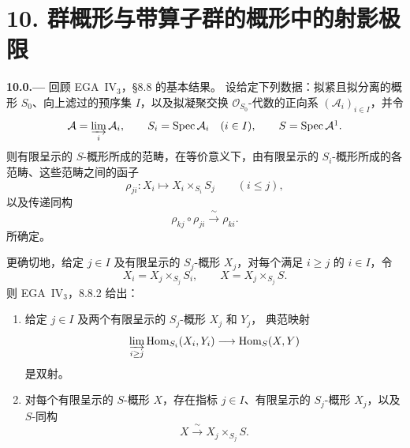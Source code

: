 
\section*{10. 群概形与带算子群的概形中的射影极限}
\label{sec:sga3-VIB-10}%

\medskip
{}\label{par:sga3-VIB-10.0}%
\noindent\textbf{10.0.---}
回顾 EGA~IV\(_3\)，\S 8.8 的基本结果。
设给定下列数据：拟紧且拟分离的概形 \(S_0\)、向上滤过的预序集
\(I\)，以及拟凝聚交换 \(\mathcal O_{S_0}\)-代数的正向系
\((\mathcal A_i)_{i\in I}\)，并令
\[
  \mathcal A=\varinjlim_i\mathcal A_i,\qquad
  S_i=\operatorname{Spec}\mathcal A_i\quad(i\in I),
  \qquad
  S=\operatorname{Spec}\mathcal A\footnotemark.
\]
则有限呈示的 \(S\)-概形所成的范畴，在等价意义下，由有限呈示的
\(S_i\)-概形所成的各范畴、这些范畴之间的函子
\[
  \rho_{ji}:X_i\longmapsto X_i\times_{S_i}S_j
  \qquad(i\leq j),
\]
以及传递同构
\[
  \rho_{kj}\circ\rho_{ji}\xrightarrow{\ \sim\ }\rho_{ki}.
\]
所确定。

更确切地，给定 \(j\in I\) 及有限呈示的 \(S_j\)-概形
\(X_j\)，对每个满足 \(i\geq j\) 的 \(i\in I\)，令
\[
  X_i=X_j\times_{S_j}S_i,
  \qquad
  X=X_j\times_{S_j}S.
\]
则 EGA~IV\(_3\)，8.8.2 给出：
\begin{enumerate}
\item[\textup{(i)}]\label{concl:sga3-VIB-10.0-i}
  给定 \(j\in I\) 及两个有限呈示的 \(S_j\)-概形 \(X_j\) 和 \(Y_j\)，
  典范映射
  \label{form:sga3-VIB-10.0-Hom-limit}%
  \[
    \varinjlim_{i\geq j}
      \operatorname{Hom}_{S_i}(X_i,Y_i)
      \longrightarrow
      \operatorname{Hom}_S(X,Y)
  \]
  是双射。

\item[\textup{(ii)}]\label{concl:sga3-VIB-10.0-ii}
  对每个有限呈示的 \(S\)-概形 \(X\)，存在指标 \(j\in I\)、有限呈示的
  \(S_j\)-概形 \(X_j\)，以及 \(S\)-同构
  \[
    X\xrightarrow{\ \sim\ }X_j\times_{S_j}S.
  \]
\end{enumerate}

